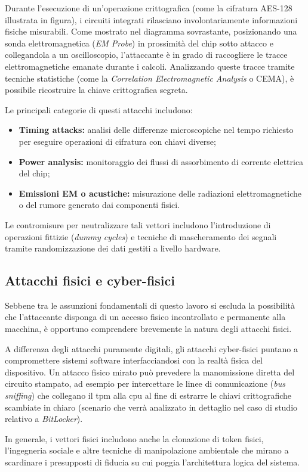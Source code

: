 Durante l'esecuzione di un'operazione crittografica (come la cifratura AES-128 illustrata in figura), i circuiti integrati rilasciano involontariamente informazioni fisiche misurabili. Come mostrato nel diagramma sovrastante, posizionando una sonda elettromagnetica (\textit{EM Probe}) in prossimità del chip sotto attacco e collegandola a un oscilloscopio, l'attaccante è in grado di raccogliere le tracce elettromagnetiche emanate durante i calcoli. Analizzando queste tracce tramite tecniche statistiche (come la \textit{Correlation Electromagnetic Analysis} o CEMA), è possibile ricostruire la chiave crittografica segreta.

Le principali categorie di questi attacchi includono:
\begin{itemize}
    \item \textbf{Timing attacks:} analisi delle differenze microscopiche nel tempo richiesto per eseguire operazioni di cifratura con chiavi diverse;
    \item \textbf{Power analysis:} monitoraggio dei flussi di assorbimento di corrente elettrica del chip;
    \item \textbf{Emissioni EM o acustiche:} misurazione delle radiazioni elettromagnetiche o del rumore generato dai componenti fisici.
\end{itemize}

Le contromisure per neutralizzare tali vettori includono l'introduzione di operazioni fittizie (\textit{dummy cycles}) e tecniche di mascheramento dei segnali tramite randomizzazione dei dati gestiti a livello hardware.


\subsection{Attacchi fisici e cyber-fisici}\label{subsec:attacchi_fisici}
Sebbene tra le assunzioni fondamentali di questo lavoro si escluda la possibilità che l'attaccante disponga di un accesso fisico incontrollato e permanente alla macchina, è opportuno comprendere brevemente la natura degli attacchi fisici.

A differenza degli attacchi puramente digitali, gli attacchi cyber-fisici puntano a compromettere sistemi software interfacciandosi con la realtà fisica del dispositivo. Un attacco fisico mirato può prevedere la manomissione diretta del circuito stampato, ad esempio per intercettare le linee di comunicazione (\textit{bus sniffing}) che collegano il \acrshort{tpm} alla \acrshort{cpu} al fine di estrarre le chiavi crittografiche scambiate in chiaro (scenario che verrà analizzato in dettaglio nel caso di studio relativo a \textit{BitLocker}). 

In generale, i vettori fisici includono anche la clonazione di token fisici, l'ingegneria sociale e altre tecniche di manipolazione ambientale che mirano a scardinare i presupposti di fiducia su cui poggia l'architettura logica del sistema.